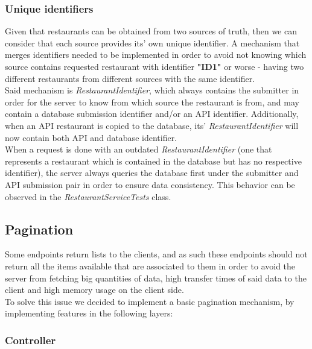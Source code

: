 \subsubsection{Unique identifiers}

Given that restaurants can be obtained from two sources of truth, then we can consider that each source provides its' own unique identifier.
A mechanism that merges identifiers needed to be implemented in order to avoid not knowing which source contains requested restaurant with
identifier \textbf{"ID1"} or worse - having two different restaurants from different sources with the same identifier.\\

Said mechanism is \textit{RestaurantIdentifier}, which always contains the submitter in order for the server to know from which source the restaurant
is from, and may contain a database submission identifier and/or an API identifier. Additionally, when an API restaurant is copied to the database,
its' \textit{RestaurantIdentifier} will now contain both API and database identifier.\\

When a request is done with an outdated \textit{RestaurantIdentifier} (one that represents a restaurant which is contained in the database but has no respective
identifier), the server always queries the database first under the submitter and API submission pair in order to ensure data consistency. This behavior
can be observed in the \textit{RestaurantServiceTests} class.

\subsection{Pagination}

Some endpoints return lists to the clients, and as such these endpoints should not return all the items available that are associated
to them in order to avoid the server from fetching big quantities of data, high transfer times of said data to the client and 
high memory usage on the client side.\\

To solve this issue we decided to implement a basic pagination mechanism, by implementing features in the following layers:\\

\subsubsection{Controller}


